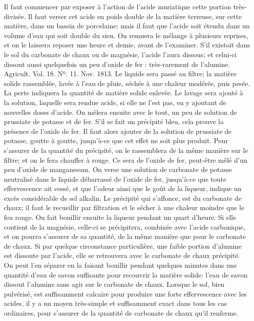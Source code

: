 Il faut commencer par exposer à l'action de l'acide muriatique cette portion très-divisée. Il faut verser cet acide en poids double de la matière terreuse, sur cette matière, dans un bassin de porcelaine; mais il faut que l'acide soit étendu dans un volume d'eau qui soit double du sien. On remuera le mélange à plusieurs reprises, et on le laissera reposer une heure et demie, avant de l'examiner.
S'il existoit dans le sol du carbonate de chaux ou de magnésie, l'acide l'aura dissous; et celui-ci dissout aussi quelquefois un peu d'oxide de fer : très-rarement de l'alumine.
Agricult. Vol. 18. Nº. 11. Nov. 1813.\setcounter{page}{428} Le liquide sera passé au filtre; la matière solide rassemblée, lavée à l'eau de pluie, séchée à une chaleur modérée, puis pesée. La perte indiquera la quantité de matière solide enlevée. Le lavage sera ajouté à la solution, laquelle sera rendue acide, si elle ne l'est pas, en y ajoutant de nouvelles doses d'acide. On mêlera ensuite avec le tout, un peu de solution de prussiate de potasse et de fer. S'il se fait un précipité bleu, cela prouve la présence de l'oxide de fer. Il faut alors ajouter de la solution de prussiate de potasse, goutte à goutte, jusqu'à-ce que cet effet ne soit plus produit. Pour s'assurer de la quantité du précipité, on le rassemblera de la même manière sur le filtre; et on le fera chauffer à rouge. Ce sera de l'oxide de fer, peut-être mêlé d'un peu d'oxide de manganesum.
On verse une solution de carbonate de potasse neutralisé dans le liquide débarrassé de l'oxide de fer, jusqu'à-ce que toute effervescence ait cessé, et que l'odeur ainsi que le goût de la liqueur, indique un excès considérable de sel alkalin.
Le précipité qui s'affonce, est du carbonate de chaux; il faut le recueillir par filtration et le sécher à une chaleur moindre que le feu rouge.\setcounter{page}{429} On fait bouillir ensuite la liqueur pendant un quart d'heure. Si elle contient de la magnésie, celle-ci se précipitera, combinée avec l'acide carbonique, et on pourra s'assurer de sa quantité, de la même manière que pour le carbonate de chaux.
Si par quelque circonstance particulière, une faible portion d'alumine est dissoute par l'acide, elle se retrouvera avec le carbonate de chaux précipité. On peut l'en séparer en la faisant bouillir pendant quelques minutes dans une quantité d'eau de savon suffisante pour recouvrir la matière solide: l'eau de savon dissout l'alumine sans agir sur le carbonate de chaux.
Lorsque le sol, bien pulvérisé, est suffisamment calcaire pour produire une forte effervescence avec les acides, il y a un moyen très-simple et suffisamment exact dans tous les cas ordinaires, pour s'assurer de la quantité de carbonate de chaux qu'il renferme.
